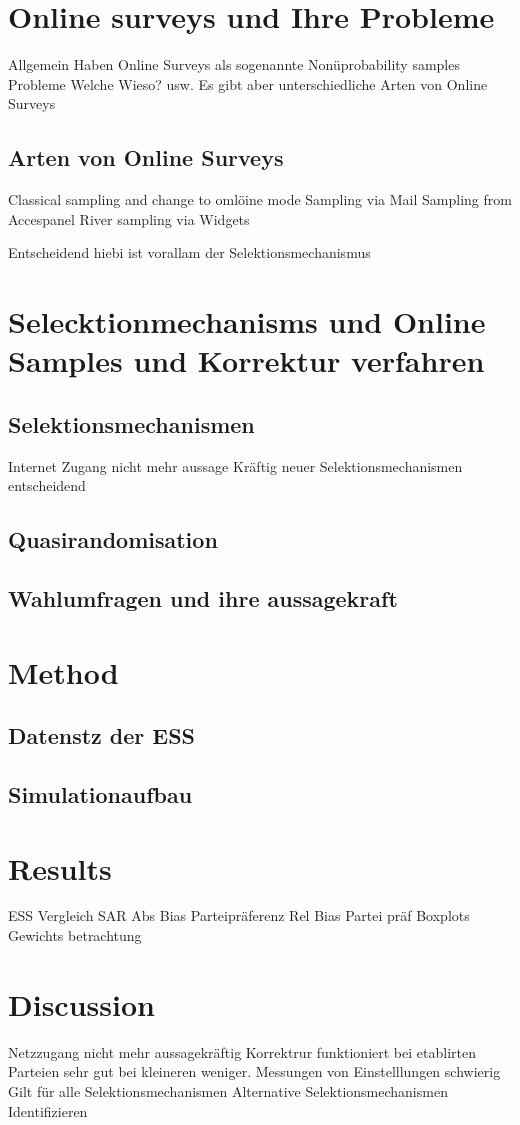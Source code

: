 \documentclass[a4paper , 11pt]{article}
\begin{document}
\section{Online surveys und Ihre Probleme}
Allgemein Haben Online Surveys als sogenannte Nonüprobability samples Probleme
Welche Wieso? usw. Es gibt aber unterschiedliche Arten von Online Surveys
\subsection{Arten von Online Surveys }
Classical sampling and change to omlöine mode
Sampling via Mail
Sampling from Accespanel
River sampling via Widgets

Entscheidend hiebi ist vorallam der Selektionsmechanismus

\section{Selecktionmechanisms und Online Samples und Korrektur verfahren}
\subsection{Selektionsmechanismen }
Internet Zugang nicht mehr aussage Kräftig neuer Selektionsmechanismen entscheidend
\subsection{Quasirandomisation}
\subsection{Wahlumfragen und ihre aussagekraft}

\section{Method}
\subsection{Datenstz der ESS}
\subsection{Simulationaufbau}
\section{Results}
ESS Vergleich
SAR
Abs Bias Parteipräferenz
Rel Bias Partei präf
Boxplots
Gewichts betrachtung
\section{Discussion}
Netzzugang nicht mehr aussagekräftig
Korrektrur funktioniert bei etablirten Parteien sehr gut bei kleineren weniger.
Messungen von Einstelllungen schwierig
Gilt für alle Selektionsmechanismen 
Alternative Selektionsmechanismen Identifizieren


 
\end{document}
